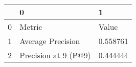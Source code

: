 \begin{tabular}{lll}
\toprule
{} &                     0 &         1 \\
\midrule
0 &                Metric &     Value \\
1 &     Average Precision &  0.558761 \\
2 &  Precision at 9 (P@9) &  0.444444 \\
\bottomrule
\end{tabular}
